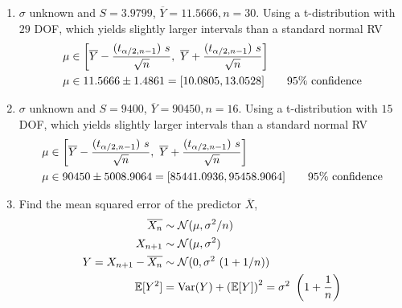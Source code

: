 \begin{enumerate}
	\item $ \sigma $ unknown and $ S = 3.9799 $, $ \overline{Y} = 11.5666, n = 30$. Using a t-distribution with $ 29 $ DOF, which yields slightly larger intervals than a standard normal RV\\
	\begin{subequations}
		\begin{align}
			\mu &\in \left[ \overline{Y} - \frac{(t_{\alpha/2, n-1})\ s}{\sqrt{n}}, \ \overline{Y} + \frac{(t_{\alpha/2, n-1})\ s}{\sqrt{n}} \right] \nonumber \\
			\mu &\in 11.5666 \pm 1.4861 = [10.0805, 13.0528] \qquad \text{95\% confidence} 
		\end{align}\\
	\end{subequations}
	
	\item $ \sigma $ unknown and $ S = 9400 $, $ \overline{Y} = 90450, n = 16$. Using a t-distribution with $ 15 $ DOF, which yields slightly larger intervals than a standard normal RV\\
	\begin{subequations}
		\begin{align}
			\mu &\in \left[ \overline{Y} - \frac{(t_{\alpha/2, n-1})\ s}{\sqrt{n}}, \ \overline{Y} + \frac{(t_{\alpha/2, n-1})\ s}{\sqrt{n}} \right] \nonumber \\
			\mu &\in 90450 \pm 5008.9064 = [85441.0936, 95458.9064] \qquad \text{95\% confidence} 
		\end{align}\\
	\end{subequations}

	\item Find the mean squared error of the predictor $ \overline{X} $, \\
	\begin{subequations}
		\begin{align}
			\overline{X_n} &\sim \mathcal{N}(\mu, \sigma^2/n) \nonumber \\
			X_{n+1} &\sim \mathcal{N}(\mu, \sigma^2) \nonumber \\
			Y = X_{n+1} - \overline{X_n} &\sim \mathcal{N}(0, \sigma^2\ (1+1/n))\nonumber \\
			\mathbb{E}[Y^2] &= \mathrm{Var}(Y) + \left(\mathbb{E}[Y]\right)^2 = \sigma^2\ \left(1+\frac{1}{n}\right)
		\end{align}\\
	\end{subequations}


\end{enumerate}
